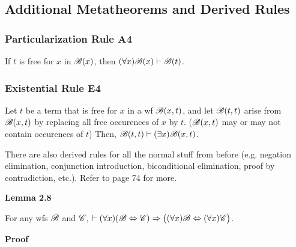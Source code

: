 \subsection{Additional Metatheorems and Derived Rules}

\subsubsection{Particularization Rule A4}

If $t$ is free for $x$ in $\mathscr{B}(x)$, then $(\forall x)\mathscr{B}(x) \vdash \mathscr{B}(t)$.

\subsubsection{Existential Rule E4}

Let $t$ be a term that is free for $x$ in a wf $\mathscr{B}(x,t)$, and let $\mathscr{B}(t,t)$ arise from $\mathscr{B}(x,t)$ by replacing all free occurences of $x$ by $t$. ($\mathscr{B}(x,t)$ may or may not contain occurences of $t$) Then, $\mathscr{B}(t, t) \vdash (\exists x) \mathscr{B}(x, t)$. 

There are also derived rules for all the normal stuff from before (e.g. negation elimination, conjunction introduction, biconditional elimination, proof by contradiction, etc.). Refer to page 74 for more.

\textbf{Lemma 2.8}

For any wfs $\mathscr{B}$ and $\mathscr{C}$, $\vdash (\forall x)(\mathscr{B} \Leftrightarrow \mathscr{C}) \Rightarrow \big((\forall x) \mathscr{B} \Leftrightarrow (\forall x) \mathscr{C} \big)$. 

\textbf{Proof}

